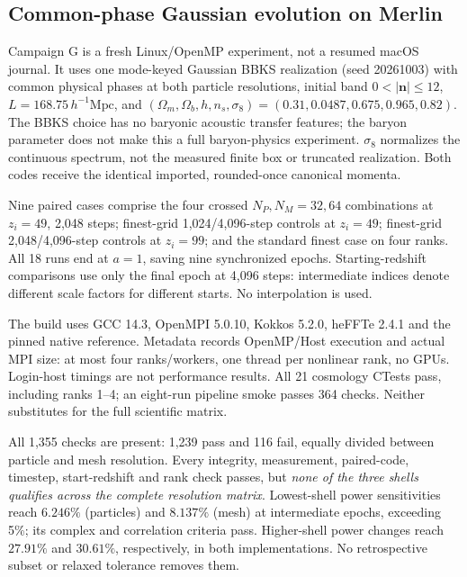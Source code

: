 \subsection{Common-phase Gaussian evolution on Merlin}
\label{app:gaussian}

Campaign G is a fresh Linux/OpenMP experiment, not a resumed macOS journal.
It uses one mode-keyed Gaussian BBKS realization (seed 20261003) with common
physical phases at both particle resolutions, initial band
$0<|\boldsymbol n|\le12$, $L=168.75\,h^{-1}\mathrm{Mpc}$, and
$(\Omega_m,\Omega_b,h,n_s,\sigma_8)=(0.31,0.0487,0.675,0.965,0.82)$.
The BBKS choice has no baryonic acoustic transfer features; the baryon parameter
does not make this a full baryon-physics experiment.  $\sigma_8$ normalizes the
continuous spectrum, not the measured finite box or truncated realization.
Both codes receive the identical imported, rounded-once canonical momenta.

Nine paired cases comprise the four crossed $N_P,N_M=32,64$ combinations
at $z_i=49$, 2,048 steps; finest-grid 1,024/4,096-step controls at $z_i=49$;
finest-grid 2,048/4,096-step controls at $z_i=99$; and the standard finest case
on four ranks.  All 18 runs end at $a=1$, saving nine synchronized epochs.
Starting-redshift comparisons use only the final epoch at 4,096 steps:
intermediate indices denote different scale factors for different starts.
No interpolation is used.

The build uses GCC 14.3, OpenMPI 5.0.10, Kokkos 5.2.0, heFFTe 2.4.1 and
the pinned native reference.  Metadata records OpenMP/Host execution and
actual MPI size: at most four ranks/workers, one thread per nonlinear rank,
no GPUs.  Login-host timings are not performance results.  All 21 cosmology
CTests pass, including ranks 1--4; an eight-run pipeline smoke passes 364 checks.
Neither substitutes for the full scientific matrix.

All 1,355 checks are present: 1,239 pass and 116 fail, equally divided between
particle and mesh resolution.  Every integrity, measurement, paired-code,
timestep, start-redshift and rank check passes, but \emph{none of the three
shells qualifies across the complete resolution matrix}.  Lowest-shell power
sensitivities reach $6.246\%$ (particles) and $8.137\%$ (mesh) at intermediate
epochs, exceeding 5\%; its complex and correlation criteria pass.
Higher-shell power changes reach $27.91\%$ and $30.61\%$, respectively, in
both implementations.  No retrospective subset or relaxed tolerance removes them.

